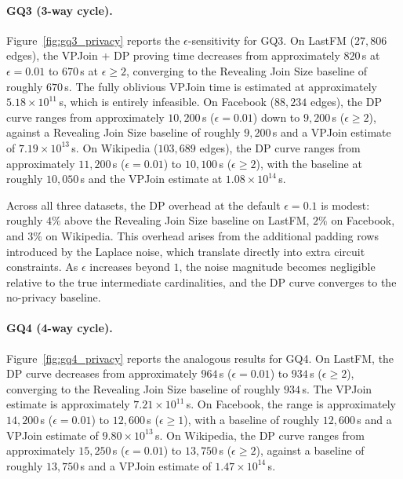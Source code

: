 \documentclass[sigconf]{acmart}
\begin{document}
\paragraph{GQ3 (3-way cycle).}
Figure~\ref{fig:gq3_privacy} reports the $\epsilon$-sensitivity for GQ3. On LastFM ($27{,}806$ edges), the VPJoin + DP proving time decreases from approximately $820$\,s at $\epsilon = 0.01$ to $670$\,s at $\epsilon \ge 2$, converging to the Revealing Join Size baseline of roughly $670$\,s. The fully oblivious VPJoin time is estimated at approximately $5.18 \times 10^{11}$\,s, which is entirely infeasible. On Facebook ($88{,}234$ edges), the DP curve ranges from approximately $10{,}200$\,s ($\epsilon = 0.01$) down to $9{,}200$\,s ($\epsilon \ge 2$), against a Revealing Join Size baseline of roughly $9{,}200$\,s and a VPJoin estimate of $7.19 \times 10^{13}$\,s. On Wikipedia ($103{,}689$ edges), the DP curve ranges from approximately $11{,}200$\,s ($\epsilon = 0.01$) to $10{,}100$\,s ($\epsilon \ge 2$), with the baseline at roughly $10{,}050$\,s and the VPJoin estimate at $1.08 \times 10^{14}$\,s.

Across all three datasets, the DP overhead at the default $\epsilon = 0.1$ is modest: roughly $4\%$ above the Revealing Join Size baseline on LastFM, $2\%$ on Facebook, and $3\%$ on Wikipedia. This overhead arises from the additional padding rows introduced by the Laplace noise, which translate directly into extra circuit constraints. As $\epsilon$ increases beyond $1$, the noise magnitude becomes negligible relative to the true intermediate cardinalities, and the DP curve converges to the no-privacy baseline.

\paragraph{GQ4 (4-way cycle).}
Figure~\ref{fig:gq4_privacy} reports the analogous results for GQ4. On LastFM, the DP curve decreases from approximately $964$\,s ($\epsilon = 0.01$) to $934$\,s ($\epsilon \ge 2$), converging to the Revealing Join Size baseline of roughly $934$\,s. The VPJoin estimate is approximately $7.21 \times 10^{11}$\,s. On Facebook, the range is approximately $14{,}200$\,s ($\epsilon = 0.01$) to $12{,}600$\,s ($\epsilon \ge 1$), with a baseline of roughly $12{,}600$\,s and a VPJoin estimate of $9.80 \times 10^{13}$\,s. On Wikipedia, the DP curve ranges from approximately $15{,}250$\,s ($\epsilon = 0.01$) to $13{,}750$\,s ($\epsilon \ge 2$), against a baseline of roughly $13{,}750$\,s and a VPJoin estimate of $1.47 \times 10^{14}$\,s.
\end{document}

